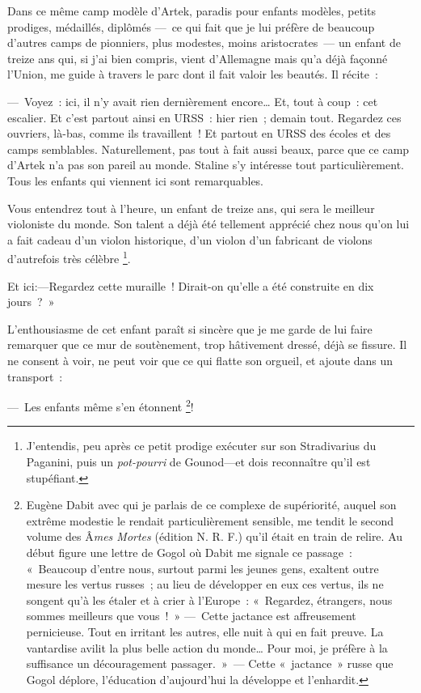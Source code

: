\documentclass[twoside]{book} %
\begin{document}
Dans ce même camp modèle d’Artek, paradis pour enfants modèles, petits prodiges, médaillés, diplômés — ce qui fait que je lui préfère de beaucoup d’autres camps de pionniers, plus modestes, moins aristocrates — un enfant de treize ans qui, si j’ai bien compris, vient d’Allemagne mais qu’a déjà façonné l’Union, me guide à travers le parc dont il fait valoir les beautés. Il récite :\par
— Voyez : ici, il n’y avait rien dernièrement encore… Et, tout à coup : cet escalier. Et c’est partout ainsi en URSS : hier rien ; demain tout. Regardez ces ouvriers, là-bas, comme ils travaillent ! Et partout en URSS des écoles et des camps semblables. Naturellement, pas tout à fait aussi beaux, parce que ce camp d’Artek n’a pas son pareil au monde. Staline s’y intéresse tout particulièrement. Tous les enfants qui viennent ici sont remarquables.\par
Vous entendrez tout à l’heure, un enfant de treize ans, qui sera le meilleur violoniste du monde. Son talent a déjà été tellement apprécié chez nous qu’on lui a fait cadeau d’un violon historique, d’un violon d’un fabricant de violons d’autrefois très célèbre \footnote{J’entendis, peu après ce petit prodige exécuter sur son Stradivarius du Paganini, puis un \emph{pot-pourri} de Gounod—et dois reconnaître qu’il est stupéfiant.}.\par
Et ici:—Regardez cette muraille ! Dirait-on qu’elle a été construite en dix jours ? »\par
L’enthousiasme de cet enfant paraît si sincère que je me garde de lui faire remarquer que ce mur de soutènement, trop hâtivement dressé, déjà se fissure. Il ne consent à voir, ne peut voir que ce qui flatte son orgueil, et ajoute dans un transport :\par
— Les enfants même s’en étonnent \footnote{Eugène Dabit avec qui je parlais de ce complexe de supériorité, auquel son extrême modestie le rendait particulièrement sensible, me tendit le second volume des Â\emph{mes Mortes} (édition N. R. F.) qu’il était en train de relire. Au début figure une lettre de Gogol où Dabit me signale ce passage : « Beaucoup d’entre nous, surtout parmi les jeunes gens, exaltent outre mesure les vertus russes ; au lieu de développer en eux ces vertus, ils ne songent qu’à les étaler et à crier à l’Europe : « Regardez, étrangers, nous sommes meilleurs que vous ! » — Cette jactance est affreusement pernicieuse. Tout en irritant les autres, elle nuit à qui en fait preuve. La vantardise avilit la plus belle action du monde… Pour moi, je préfère à la suffisance un découragement passager. » — Cette « jactance » russe que Gogol déplore, l’éducation d’aujourd’hui la développe et l’enhardit.}!\par
\end{document}
